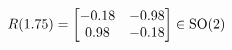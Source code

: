 \documentclass[preview]{standalone}
\begin{document}
\begin{align*}
\special{dvisvgm:raw <g id='unique000'>}R(1.75) = \begin{bmatrix} -0.18 & -0.98 \\ 0.98 & -0.18 \end{bmatrix} \in \text{SO}(2)\special{dvisvgm:raw </g>}
\end{align*}
\end{document}
